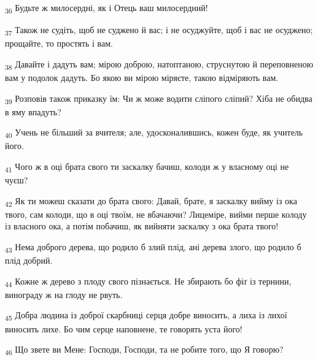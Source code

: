 \begin{tcolorbox}
\textsubscript{36} Будьте ж милосердні, як і Отець ваш милосердний!
\end{tcolorbox}
\begin{tcolorbox}
\textsubscript{37} Також не судіть, щоб не суджено й вас; і не осуджуйте, щоб і вас не осуджено; прощайте, то простять і вам.
\end{tcolorbox}
\begin{tcolorbox}
\textsubscript{38} Давайте і дадуть вам; мірою доброю, натоптаною, струснутою й переповненою вам у подолок дадуть. Бо якою ви мірою міряєте, такою відміряють вам.
\end{tcolorbox}
\begin{tcolorbox}
\textsubscript{39} Розповів також приказку їм: Чи ж може водити сліпого сліпий? Хіба не обидва в яму впадуть?
\end{tcolorbox}
\begin{tcolorbox}
\textsubscript{40} Учень не більший за вчителя; але, удосконалившись, кожен буде, як учитель його.
\end{tcolorbox}
\begin{tcolorbox}
\textsubscript{41} Чого ж в оці брата свого ти заскалку бачиш, колоди ж у власному оці не чуєш?
\end{tcolorbox}
\begin{tcolorbox}
\textsubscript{42} Як ти можеш сказати до брата свого: Давай, брате, я заскалку вийму із ока твого, сам колоди, що в оці твоїм, не вбачаючи? Лицеміре, вийми перше колоду із власного ока, а потім побачиш, як вийняти заскалку з ока брата твого!
\end{tcolorbox}
\begin{tcolorbox}
\textsubscript{43} Нема доброго дерева, що родило б злий плід, ані дерева злого, що родило б плід добрий.
\end{tcolorbox}
\begin{tcolorbox}
\textsubscript{44} Кожне ж дерево з плоду свого пізнається. Не збирають бо фіґ із тернини, винограду ж на глоду не рвуть.
\end{tcolorbox}
\begin{tcolorbox}
\textsubscript{45} Добра людина із доброї скарбниці серця добре виносить, а лиха із лихої виносить лихе. Бо чим серце наповнене, те говорять уста його!
\end{tcolorbox}
\begin{tcolorbox}
\textsubscript{46} Що звете ви Мене: Господи, Господи, та не робите того, що Я говорю?
\end{tcolorbox}

